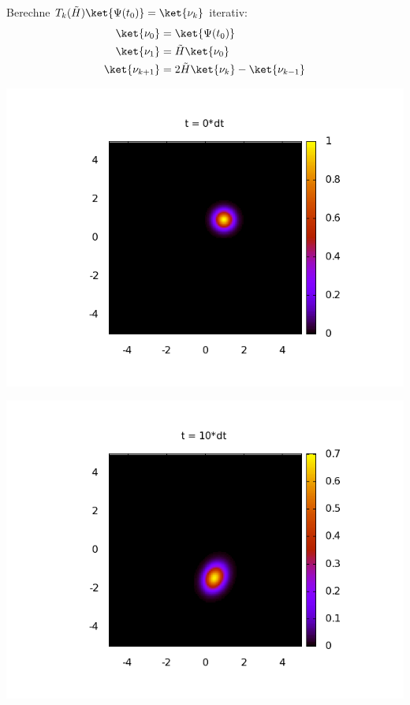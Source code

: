 Berechne $T_k(\tilde H) \ket {\Psi(t_0)} = \ket{\nu_k}$ iterativ:
\begin{align}
  \ket{\nu_0} &= \ket{\Psi(t_0)}\\
  \ket{\nu_1} &= \tilde H \ket{\nu_0}\\
  \ket{\nu_{k+1}} &= 2\tilde H \ket{\nu_k}-\ket{\nu_{k-1}}
\end{align}
\begin{center}

\begin{minipage}[t]{.49\textwidth}
 \includegraphics[width=1\linewidth]{pictures/Poincare_0dt.png}

\end{minipage}
\begin{minipage}[t]{.49\textwidth}
 \includegraphics[width=1\linewidth]{pictures/Poincare_10dt.png}
\end{minipage}


\end{center}
